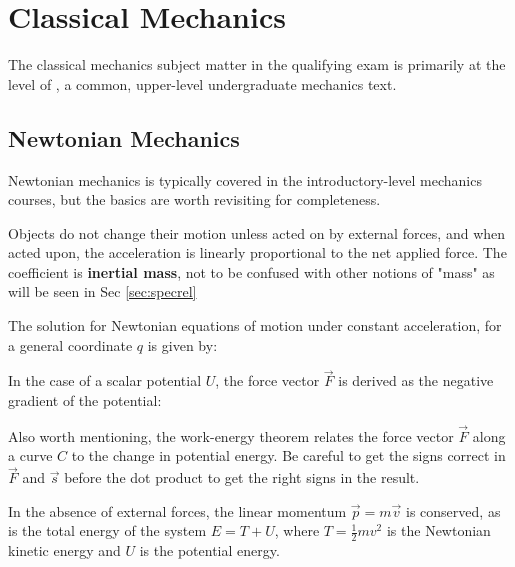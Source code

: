\newpage
\chapter{Classical Mechanics}
\label{sec:classmech}
The classical mechanics subject matter in the qualifying exam is primarily at the level of \cite{thorntonClassicalDynamicsParticles2004}, a common, upper-level undergraduate mechanics text.


\section{Newtonian Mechanics}
\label{sec:cm-newtonian}
Newtonian mechanics is typically covered in the introductory-level mechanics courses, but the basics are worth revisiting for completeness.

Objects do not change their motion unless acted on by external forces, and when acted upon, the acceleration is linearly proportional to the net applied force. The coefficient is \textbf{inertial mass}, not to be confused with other notions of "mass" as will be seen in Sec \ref{sec:specrel}


The solution for Newtonian equations of motion under constant acceleration, for a general coordinate $q$ is given by: 


In the case of a scalar potential $U$, the force vector $\vec{F}$ is derived as the negative gradient of the potential:

Also worth mentioning, the work-energy theorem relates the force vector $\vec{F}$ along a curve $C$ to the change in potential energy. Be careful to get the signs correct in $\vec{F}$ and $\vec{s}$ before the dot product to get the right signs in the result.

In the absence of external forces, the linear momentum $\vec{p} = m\vec{v}$ is conserved, as is the total energy of the system $E = T + U$, where $T = \frac{1}{2}mv^2$ is the Newtonian kinetic energy and $U$ is the potential energy.

